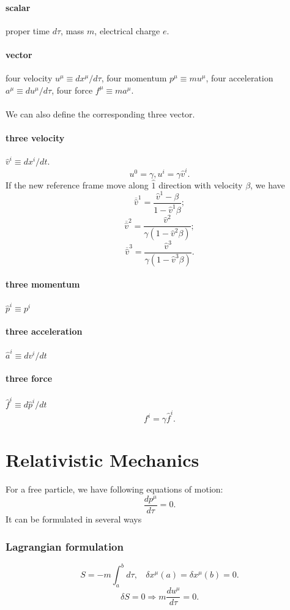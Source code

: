 \paragraph{scalar} proper time $d \tau$, mass $m$, electrical charge $e$.
\paragraph{vector} four velocity $u^{\mu} \equiv {dx^{\mu}}/{d \tau}$, four momentum $p^{\mu} \equiv m u^{\mu}$, four acceleration $a^{\mu} \equiv {du^{\mu}}/{d \tau}$, four force $f^{\mu} \equiv m a^{\mu}$.
\\ \\
We can also define the corresponding three vector.
\paragraph{three velocity} $\hat{v}^{i} \equiv {dx^i}/{dt}$.
\[u^0 = \gamma, u^i = \gamma \hat{v}^i.\]
If the new reference frame move along $\hat{1}$ direction with velocity $\beta$, we have
\[\overline{\hat{v}}^1 = \frac{\hat{v}^1 - \beta}{1-\hat{v}^1 \beta};\]
\[\overline{\hat{v}}^2 = \frac{\hat{v}^2}{\gamma(1-\hat{v}^2 \beta)};\]
\[\overline{\hat{v}}^3 = \frac{\hat{v}^3}{\gamma(1-\hat{v}^3 \beta)}.\]
\paragraph{three momentum} $\hat{p}^{i} \equiv p^i$
\paragraph{three acceleration} $\hat{a}^{i} \equiv {dv^i}/{dt}$
\paragraph{three force} $\hat{f}^i \equiv {d\hat{p}^i}/{dt}$
\[f^i = \gamma \hat{f}^i.\]

\section{Relativistic Mechanics}
For a free particle, we have following equations of motion:
\[\frac{dp^{\mu}}{d\tau} = 0.\]
It can be formulated in several ways
\subsubsection{Lagrangian formulation}
\[S=-m\int_{a}^{b} d\tau, \ \ \ \ \delta x^{\mu}(a) = \delta x^{\mu}(b) = 0.\]
\[\delta S = 0 \Rightarrow m\frac{du^{\mu}}{d\tau} = 0.\]
